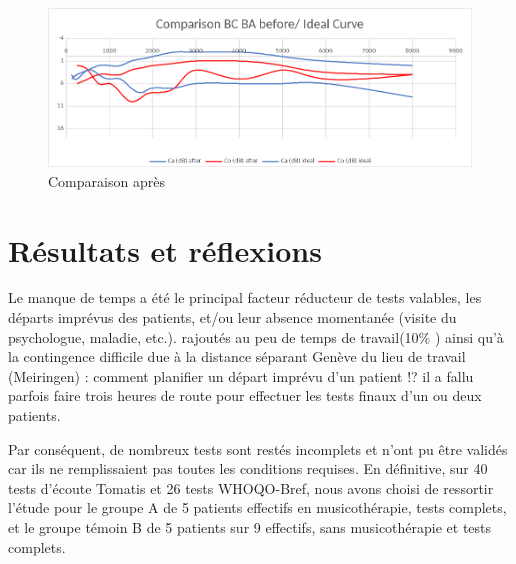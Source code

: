 \begin{enumerate}
 \lipsum[1]
 
 \begin{figure}[bh]
 	\centering
 	\includegraphics[width=0.7\linewidth]{images/clinique/comparison_bc_ba_after_vs_ideal_curve_meyer.png}
 	\caption{Comparaison après}
 	\label{fig:comparisonbcbaaftervsidealcurvemeyer}
 \end{figure}
 
 	
 	
 \section{Résultats et réflexions}	

Le manque de temps a été le principal facteur  réducteur
de tests valables, les départs imprévus des patients, et/ou leur
absence momentanée (visite du psychologue, maladie, etc.). rajoutés au peu de temps de travail(10\% ) ainsi qu'à la
contingence difficile due à la distance séparant Genève du lieu de travail (Meiringen)
: comment planifier un départ imprévu d'un patient !? il a fallu parfois
faire trois heures de route pour effectuer les tests finaux d'un ou deux
patients.
  
Par conséquent,  de nombreux tests sont restés 
incomplets et n'ont pu
être validés car ils ne remplissaient pas toutes les conditions requises.  En définitive, sur 40 tests d'écoute Tomatis et 26 tests
WHOQO-Bref, nous avons choisi de ressortir l'étude pour le groupe A de
5 patients effectifs en musicothérapie, tests complets, et le groupe
témoin B de 5 patients sur 9 effectifs, sans musicothérapie et tests
complets. 
 

  


\end{enumerate}

